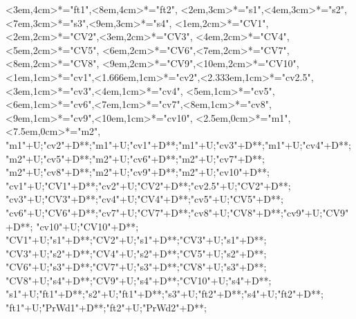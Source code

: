 \begin{multicols}{2}
\begin{exe}
{\begin{xlist}
{					<3em,4cm>*\as{Ft}="ft1",<8em,4cm>*="ft2",
					<2em,3cm>*\as{σ}="s1",<4em,3cm>*="s2",<7em,3cm>*="s3",<9em,3cm>*="s4",
					<1em,2cm>*="CV1",<2em,2cm>*="CV2",<3em,2cm>*="CV3",
					<4em,2cm>*="CV4",<5em,2cm>*="CV5",
					<6em,2cm>*="CV6",<7em,2cm>*="CV7",<8em,2cm>*="CV8",
					<9em,2cm>*="CV9",<10em,2cm>*="CV10",
					<1em,1cm>*="cv1",<1.666em,1cm>*="cv2",<2.333em,1cm>*="cv2.5",<3em,1cm>*="cv3",<4em,1cm>*="cv4",
					<5em,1cm>*="cv5",<6em,1cm>*="cv6",<7em,1cm>*="cv7",<8em,1cm>*="cv8",
					<9em,1cm>*="cv9",<10em,1cm>*="cv10",
					<2.5em,0cm>*\as{M}="m1",<7.5em,0cm>*="m2",
					"m1"+U;"cv2"+D**\dir{-};"m1"+U;"cv1"+D**\dir{-};"m1"+U;"cv3"+D**\dir{-};"m1"+U;"cv4"+D**\dir{-};
					"m2"+U;"cv5"+D**\dir{-};"m2"+U;"cv6"+D**\dir{-};"m2"+U;"cv7"+D**\dir{-};
					"m2"+U;"cv8"+D**\dir{-};"m2"+U;"cv9"+D**\dir{-};"m2"+U;"cv10"+D**\dir{-};
					"cv1"+U;"CV1"+D**\dir{-};"cv2"+U;"CV2"+D**\dir{-};"cv2.5"+U;"CV2"+D**\dir{-};
					"cv3"+U;"CV3"+D**\dir{-};"cv4"+U;"CV4"+D**\dir{-};"cv5"+U;"CV5"+D**\dir{-};
					"cv6"+U;"CV6"+D**\dir{-};"cv7"+U;"CV7"+D**\dir{-};"cv8"+U;"CV8"+D**\dir{-};"cv9"+U;"CV9"+D**\dir{-};
					"cv10"+U;"CV10"+D**\dir{-};
					"CV1"+U;"s1"+D**\dir{-};"CV2"+U;"s1"+D**\dir{-};"CV3"+U;"s1"+D**\dir{-};
					"CV3"+U;"s2"+D**\dir{-};"CV4"+U;"s2"+D**\dir{-};"CV5"+U;"s2"+D**\dir{-};
					"CV6"+U;"s3"+D**\dir{-};"CV7"+U;"s3"+D**\dir{-};"CV8"+U;"s3"+D**\dir{-};
					"CV8"+U;"s4"+D**\dir{-};"CV9"+U;"s4"+D**\dir{-};"CV10"+U;"s4"+D**\dir{-};
					"s1"+U;"ft1"+D**\dir{-};"s2"+U;"ft1"+D**\dir{-};"s3"+U;"ft2"+D**\dir{-};"s4"+U;"ft2"+D**\dir{-};
					"ft1"+U;"PrWd1"+D**\dir{-};"ft2"+U;"PrWd2"+D**\dir{-};
			\endxy}
		\end{xlist}}
	\end{exe}
\end{multicols}

%
